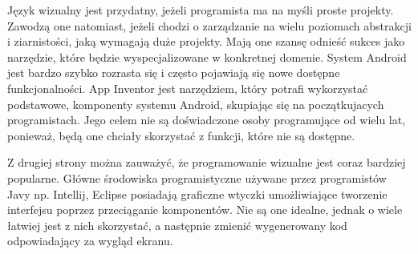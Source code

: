 Język wizualny jest przydatny, jeżeli programista ma na myśli proste projekty. Zawodzą one natomiast, jeżeli chodzi o zarządzanie na wielu poziomach abstrakcji i ziarnistości, jaką wymagają duże projekty. Mają one szansę odnieść sukces jako narzędzie, które będzie wyspecjalizowane w konkretnej domenie. System Android jest bardzo szybko rozrasta się i często pojawiają się nowe dostępne funkcjonalności. App Inventor jest narzędziem, który potrafi wykorzystać podstawowe, komponenty systemu Android, skupiając się na początkujacych programistach. Jego celem nie są doświadczone osoby programujące od wielu lat, ponieważ, będą one chciały skorzystać z funkcji, które nie są dostępne.

Z drugiej strony można zauważyć, że programowanie wizualne jest coraz bardziej popularne. Główne środowiska programistyczne używane przez programistów Javy np. Intellij, Eclipse posiadają graficzne wtyczki umożliwiające tworzenie interfejsu poprzez przeciąganie komponentów. Nie są one idealne, jednak o wiele łatwiej jest z nich skorzystać, a następnie zmienić wygenerowany kod odpowiadający za wygląd ekranu.





